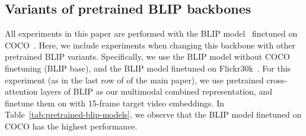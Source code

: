 \begin{table}
    \caption{\textbf{Querying with a video:}
        We report results on \ourDSm by using multiple frames from the query {\em video}.
        Recall that the rest of the paper investigates the setup where the middle video frame is used as an {\em image} query.
        To keep the computational complexity low, we only use 5 query video frames (uniformly sampled
        throughout the video). The number of target video frames remains unchanged as 15.
        The performance is similar to the image query setup, with marginal increase.
    }
    \label{tab:video-query} \centering
\end{table} 

\subsection{Variants of pretrained BLIP backbones}
\label{app:subsec:pretrained-blip-models}
All experiments in this paper
are performed with the BLIP model~\cite{BLIP} finetuned on COCO~\cite{coco}. Here, we include
experiments when changing this backbone with other pretrained BLIP variants.
Specifically, we use the BLIP model without COCO finetuning (BLIP base),
and the BLIP model finetuned on Flickr30k~\cite{Plummer2015Flickr30k}. For this experiment
(as in the last row of
\if{} \fi
of the main paper),
we use pretrained cross-attention layers of BLIP as our multimodal combined representation,
and finetune them on \ourDS with 15-frame target video embeddings.
In Table~\ref{tab:pretrained-blip-models}, we observe that the BLIP model finetuned on COCO has the highest performance.

